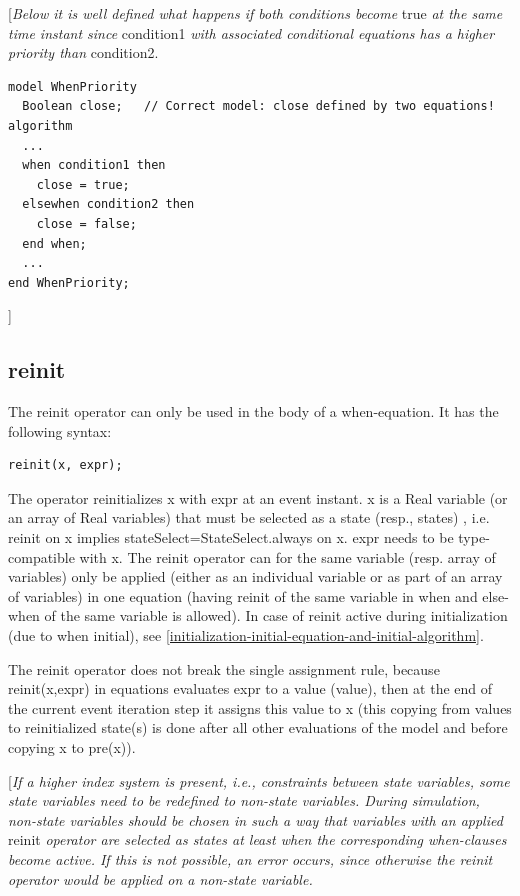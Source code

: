 \documentclass[10pt,a4paper]{report}
\def\doublelabel#1{\label{#1}}
\begin{document}
{[}\emph{Below it is well defined what happens if both conditions
become} true \emph{at the same time instant since} condition1 \emph{with
associated conditional equations has a higher priority than} condition2.

\begin{lstlisting}[language=modelica]
model WhenPriority   
  Boolean close;   // Correct model: close defined by two equations! 
algorithm   
  ...   
  when condition1 then
    close = true;
  elsewhen condition2 then
    close = false;
  end when;   
  ... 
end WhenPriority; 
\end{lstlisting}

{]}

\subsection{reinit}\doublelabel{reinit}

The reinit operator can only be used in the body of a when-equation. It
has the following syntax:

\begin{lstlisting}[language=modelica]
reinit(x, expr);
\end{lstlisting}

The operator reinitializes x with expr at an event instant. x is a Real
variable (or an array of Real variables) that must be selected as a
state (resp., states) , i.e. reinit on x implies
stateSelect=StateSelect.always on x. expr needs to be type-compatible
with x. The reinit operator can for the same variable (resp. array of
variables) only be applied (either as an individual variable or as part
of an array of variables) in one equation (having reinit of the same
variable in when and else-when of the same variable is allowed). In case
of reinit active during initialization (due to when initial), see
\ref{initialization-initial-equation-and-initial-algorithm}.

The reinit operator does not break the single assignment rule, because
reinit(x,expr) in equations evaluates expr to a value (value), then at
the end of the current event iteration step it assigns this value to x
(this copying from values to reinitialized state(s) is done after all
other evaluations of the model and before copying x to pre(x)).

{[}\emph{If a higher index system is present, i.e., constraints between
state variables, some state variables need to be redefined to non-state
variables. During simulation, non-state variables should be chosen in
such a way that variables with an applied} reinit \emph{operator are
selected as states at least when the corresponding when-clauses become
active. If this is not possible, an error occurs, since otherwise the
reinit operator would be applied on a non-state variable.}
\end{document}
